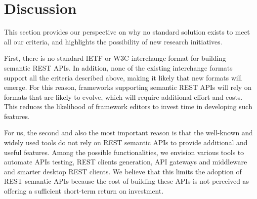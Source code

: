 \vspace*{-0.3cm}
\section{Discussion} \label{sec:discussion}

\vspace*{-0.2cm}


This section provides our perspective on why no standard solution exists to meet all our criteria, and highlights the possibility of new research initiatives.

First, there is no standard IETF or W3C interchange format for building semantic REST APIs. In addition, none of the existing interchange formats support all the criteria described above, making it likely that new formats will emerge.
For this reason, frameworks supporting semantic REST APIs will rely on formats that are likely to evolve, which will require additional effort and costs. This reduces the likelihood of framework editors to invest time in developing such features. 

For us, the second and also the most important reason is that the well-known and widely used tools do not rely on REST semantic APIs to provide additional and useful features. Among the possible functionalities, we envision various tools to automate APIs testing, REST clients generation, API gateways and middleware and smarter desktop REST clients.
We believe that this limits the adoption of REST semantic APIs because the cost of building these APIs is not perceived as offering a sufficient short-term return on investment.



